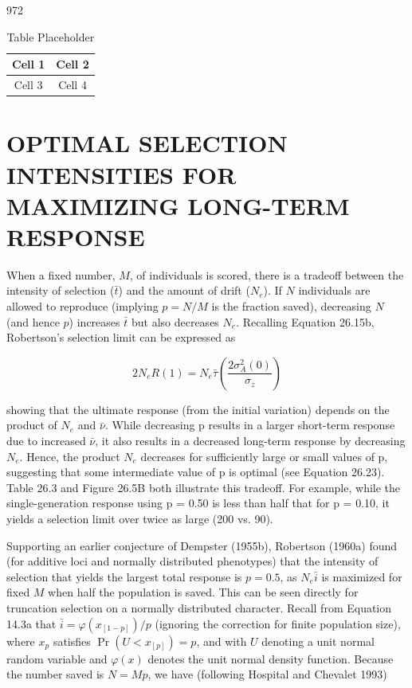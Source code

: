 \documentclass{article}
\begin{document}
{972

\begin{table}[h]
\centering
\begin{tabular}{|c|c|}
\hline
Cell 1 & Cell 2 \\
\hline
Cell 3 & Cell 4 \\
\hline
\end{tabular}
\caption{Table Placeholder}
\end{table}

\section{OPTIMAL SELECTION INTENSITIES FOR MAXIMIZING LONG-TERM RESPONSE}
When a fixed number, $M$, of individuals is scored, there is a tradeoff between the intensity of selection ($\bar{t}$) and the amount of drift ($N_e$). If $N$ individuals are allowed to reproduce (implying $p = N/M$ is the fraction saved), decreasing $N$ (and hence $p$) increases $\bar{t}$ but also decreases $N_e$. Recalling Equation 26.15b, Robertson’s selection limit can be expressed as

\begin{equation}
2N_{e}R(1)=N_{e}\bar{\tau}\left(\frac{2\sigma_{A}^{2}(0)}{\sigma_{z}}\right)
\tag{26.22}
\label{eq:26_22}
\end{equation}

showing that the ultimate response (from the initial variation) depends on the product of  $ N_e $ and  $ \bar{\nu} $. While decreasing p results in a larger short-term response due to increased  $ \bar{\nu} $, it also results in a decreased long-term response by decreasing  $ N_e $. Hence, the product  $ N_e $ decreases for sufficiently large or small values of p, suggesting that some intermediate value of p is optimal (see Equation 26.23). Table 26.3 and Figure 26.5B both illustrate this tradeoff. For example, while the single-generation response using p = 0.50 is less than half that for p = 0.10, it yields a selection limit over twice as large (200 vs. 90).

Supporting an earlier conjecture of Dempster (1955b), Robertson (1960a) found (for additive loci and normally distributed phenotypes) that the intensity of selection that yields the largest total response is $p = 0.5$, as $N_e \bar{i}$ is maximized for fixed $M$ when half the population is saved. This can be seen directly for truncation selection on a normally distributed character. Recall from Equation 14.3a that $\bar{i} = \varphi(x_{[1-p]}) / p$ (ignoring the correction for finite population size), where $x_p$ satisfies $\Pr(U < x_{[p]}) = p$, and with $U$ denoting a unit normal random variable and $\varphi(x)$ denotes the unit normal density function. Because the number saved is $N = M p$, we have (following Hospital and Chevalet 1993)

}
\end{document}
